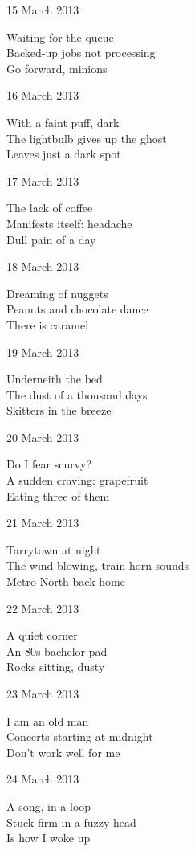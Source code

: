 \documentclass[12pt]{article}
\begin{document}
15 March 2013

Waiting for the queue \\
Backed-up jobs not processing \\
Go forward, minions

16 March 2013

With a faint puff, dark \\
The lightbulb gives up the ghost \\
Leaves just a dark spot

17 March 2013

The lack of coffee \\
Manifests itself: headache \\
Dull pain of a day

\newpage

18 March 2013

Dreaming of nuggets \\
Peanuts and chocolate dance \\
There is caramel

19 March 2013

Underneith the bed \\
The dust of a thousand days \\
Skitters in the breeze

20 March 2013

Do I fear scurvy? \\
A sudden craving: grapefruit \\
Eating three of them

21 March 2013

Tarrytown at night \\
The wind blowing, train horn sounds \\
Metro North back home

22 March 2013

A quiet corner \\
An 80s bachelor pad \\
Rocks sitting, dusty

23 March 2013

I am an old man \\
Concerts starting at midnight \\
Don't work well for me

24 March 2013

A song, in a loop \\
Stuck firm in a fuzzy head \\
Is how I woke up

\newpage
\end{document}
